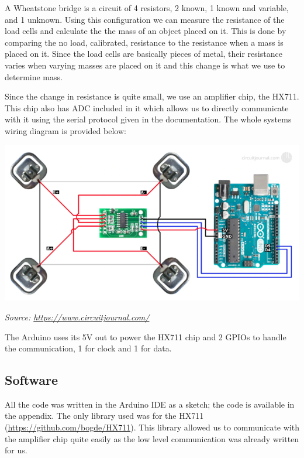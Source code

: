 \documentclass[letterpaper,11pt]{article}
\begin{document}
A Wheatstone bridge is a circuit of 4 resistors, 2 known, 1 known and variable,
and 1 unknown. Using this configuration we can measure the resistance of the
load cells and calculate the the mass of an object placed on it. This is done by
comparing the no load, calibrated, resistance to the resistance when a mass is
placed on it. Since the load cells are basically pieces of metal, their
resistance varies when varying masses are placed on it and this change is what
we use to determine mass.

Since the change in resistance is quite small, we use an amplifier chip, the
HX711. This chip also has ADC included in it which allows us to directly
communicate with it using the serial protocol given in the documentation. The
whole systems wiring diagram is provided below:

{\center\includegraphics[scale=.3]{sytemwiring}\par}
{\textit{Source: \href{https://circuitjournal.com/50kg-load-cells-with-HX711}{https://www.circuitjournal.com/}}}

The Arduino uses its 5V out to power the HX711 chip and 2 GPIOs to handle the
communication, 1 for clock and 1 for data.

\subsection{Software}
All the code was written in the Arduino IDE as a sketch; the code is available
in the appendix. The only library used was for the HX711
(\href{https://github.com/bogde/HX711}{https://github.com/bogde/HX711}). This
library allowed us to communicate with the amplifier chip quite easily as the
low level communication was already written for us.
\end{document}
